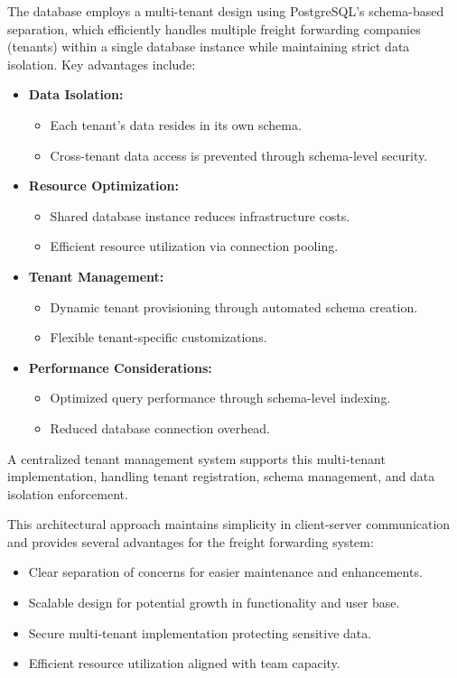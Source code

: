The database employs a multi-tenant design using PostgreSQL's schema-based separation, which efficiently handles multiple freight forwarding companies (tenants) within a single database instance while maintaining strict data isolation. Key advantages include:

\begin{itemize}
    \item \textbf{Data Isolation:}
    \begin{itemize}
        \item Each tenant's data resides in its own schema.
        \item Cross-tenant data access is prevented through schema-level security.
    \end{itemize}
    
    \item \textbf{Resource Optimization:}
    \begin{itemize}
        \item Shared database instance reduces infrastructure costs.
        \item Efficient resource utilization via connection pooling.
    \end{itemize}
    
    \item \textbf{Tenant Management:}
    \begin{itemize}
        \item Dynamic tenant provisioning through automated schema creation.
        \item Flexible tenant-specific customizations.
    \end{itemize}
    
    \item \textbf{Performance Considerations:}
    \begin{itemize}
        \item Optimized query performance through schema-level indexing.
        \item Reduced database connection overhead.
    \end{itemize}
\end{itemize}

A centralized tenant management system supports this multi-tenant implementation, handling tenant registration, schema management, and data isolation enforcement.

This architectural approach maintains simplicity in client-server communication and provides several advantages for the freight forwarding system:
\begin{itemize}
    \item Clear separation of concerns for easier maintenance and enhancements.
    \item Scalable design for potential growth in functionality and user base.
    \item Secure multi-tenant implementation protecting sensitive data.
    \item Efficient resource utilization aligned with team capacity.
\end{itemize}

